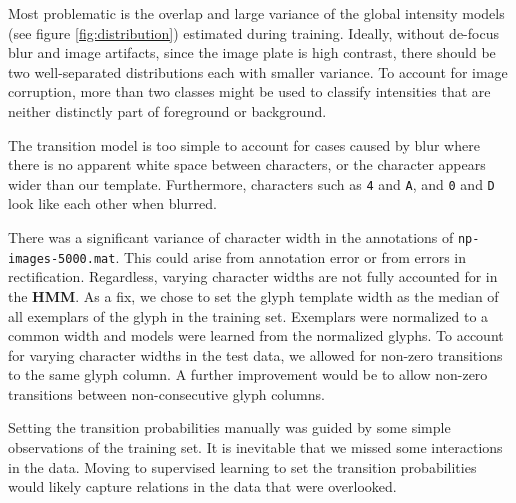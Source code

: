 \documentclass[a4paper,12pt]{article}
\begin{document}
Most problematic is the overlap and large variance of the global
intensity models (see figure \ref{fig:distribution}) estimated during
training. Ideally, without de-focus blur and image artifacts, since the
image plate is high contrast, there should be two well-separated
distributions each with smaller variance. To account for image
corruption, more than two classes might be used to classify
intensities that are neither distinctly part of foreground or
background.

The transition model is too simple to account for cases caused by blur
where there is no apparent white space between characters, or the
character appears wider than our template. Furthermore, characters
such as \texttt{4} and \texttt{A}, and \texttt{0} and \texttt{D} look
like each other when blurred.

There was a significant variance of character width in the annotations
of \texttt{np-images-5000.mat}. This could arise from annotation error
or from errors in rectification. Regardless, varying character widths
are not fully accounted for in the \textbf{HMM}. As a fix, we
chose to set the glyph template width as the median of all exemplars
of the glyph in the training set. Exemplars were normalized to a
common width and models were learned from the normalized glyphs. To
account for varying character widths in the test data, we allowed for 
non-zero transitions to the same glyph column.  A further improvement
would be to allow non-zero transitions between non-consecutive glyph
columns. 

Setting the transition probabilities manually was guided by some
simple observations of the training set. It is inevitable that we
missed some interactions in the data. Moving to supervised
learning to set the transition probabilities would likely capture
relations in the data that were overlooked. 
\end{document}
